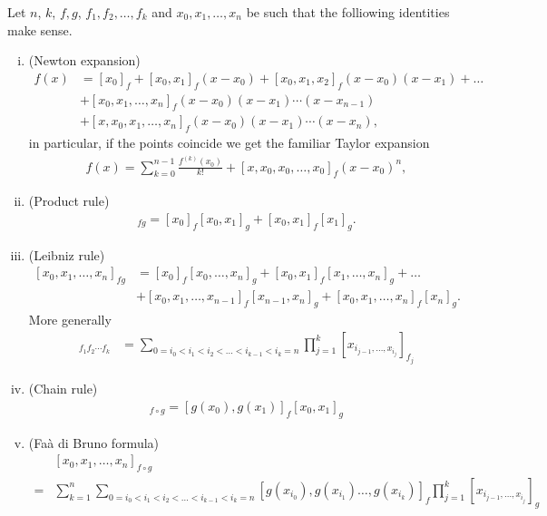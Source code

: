\begin{prop}
	Let $n$, $k$, $f, g$, $f_{1}, f_{2}, \ldots, f_{k}$ and $x_{0}, x_{1}, \ldots, x_{n}$ be such that the folliowing identities make sense.
	\begin{enumerate}[(i)]
		\item (Newton expansion)
		\begin{align}\label{newton_expansion}
			f(x) &= [x_{0}]_{f} + [x_{0}, x_{1}]_{f} (x - x_{0})  + [x_{0}, x_{1}, x_{2}]_{f} (x - x_{0}) (x - x_{1}) + \ldots \\
			& + [x_{0}, x_{1}, \ldots, x_{n}]_{f} (x - x_{0}) (x - x_{1}) \cdots (x - x_{n - 1}) \nonumber\\
			& + [x, x_{0}, x_{1}, \ldots, x_{n}]_{f} (x - x_{0}) (x - x_{1}) \cdots (x - x_{n}) \nonumber,
		\end{align}
		in particular, if the points coincide we get the familiar Taylor expansion
		\begin{align}\label{taylor_expansion}
			f(x) = \sum_{k = 0}^{n - 1} \frac{f^{(k)}(x_{0})}{k!} + [x, x_{0}, x_{0}, \ldots, x_{0}]_{f} (x - x_{0})^{n},
		\end{align}
		\item (Product rule)
		\begin{align*}
			[x_{0}, x_{1}]_{f g} = [x_{0}]_{f} [x_{0}, x_{1}]_{g} + [x_{0}, x_{1}]_{f} [x_{1}]_{g}.
		\end{align*}
		\item (Leibniz rule)
		\begin{align}\label{leibniz_rule}
			[x_{0}, x_{1}, \ldots, x_{n}]_{f g} &= [x_{0}]_{f} [x_{0}, \ldots, x_{n}]_{g} + [x_{0}, x_{1}]_{f} [x_{1}, \ldots, x_{n}]_{g} + \ldots\\
			&+ [x_{0}, x_{1}, \ldots, x_{n - 1}]_{f} [x_{n - 1}, x_{n}]_{g} + [x_{0}, x_{1}, \ldots, x_{n}]_{f} [x_{n}]_{g} \nonumber.
		\end{align}
		More generally
		\begin{align*}
			[x_{0}, x_{1}, \ldots, x_{n}]_{f_{1} f_{2} \cdots f_{k}} &= \sum_{0 = i_{0} < i_{1} < i_{2} < \ldots < i_{k - 1} < i_{k} = n} \prod_{j = 1}^{k} [x_{i_{j - 1}, \ldots, x_{i_{j}}}]_{f_{j}}
		\end{align*}
		\item (Chain rule)
		\begin{align*}
			[x_{0}, x_{1}]_{f \circ g} = [g(x_{0}), g(x_{1})]_{f} [x_{0}, x_{1}]_{g}
		\end{align*}
		\item (Fa\`{a} di Bruno formula)
		\begin{align*}
			& [x_{0}, x_{1}, \ldots, x_{n}]_{f \circ g} \\
			=& \sum_{k = 1}^{n} \sum_{0 = i_{0}< i_{1} < i_{2} < \ldots < i_{k - 1} < i_{k} =  n} [g(x_{i_{0}}), g(x_{i_{1}})\ldots , g(x_{i_{k}})]_{f} \prod_{j = 1}^{k} [x_{i_{j - 1}, \ldots, x_{i_{j}}}]_{g}
		\end{align*}
	\end{enumerate}
\end{prop}
